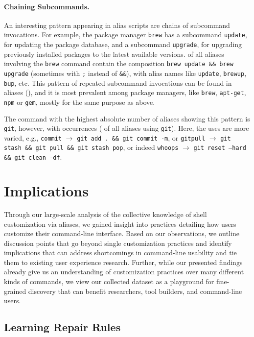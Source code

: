 \documentclass[sigconf,nonacm,screen]{acmart}
\newcommand{\num}[1]{\numprint{#1}}
\newcommand{\per}[1]{\numprint[\%]{#1}}
\newcommand{\alias}[2]{{\texttt{#1} $\rightarrow$ \texttt{#2}}}
\newcommand{\cmd}[1]{{\texttt{#1}}}
\begin{document}
\paragraph{\bf Chaining Subcommands.}

An interesting pattern appearing in alias scripts are chains of subcommand invocations.
For example, the package manager \cmd{brew} has a subcommand \texttt{update}, for updating the package database, and a subcommand \texttt{upgrade}, for upgrading previously installed packages to the latest available versions.
\per{28.08} of all aliases involving the \cmd{brew} command contain the composition \verb|brew update && brew upgrade| (sometimes with \verb|;| instead of \verb|&&|), with alias names like \verb|update|, \verb|brewup|, \verb|bup|, etc.
This pattern of repeated subcommand invocations can be found in \num{22062} aliases (\per{1}), and it is most prevalent among package managers, like \cmd{brew}, \cmd{apt-get}, \cmd{npm} or \cmd{gem}, mostly for the same purpose as above.

The command with the highest absolute number of aliases showing this pattern is \cmd{git}, however, with \num{12063} occurrences (\per{3.89} of all aliases using \cmd{git}).
Here, the uses are more varied, 
e.g., \alias{commit}{git add . \&\& git commit -m}, 
or \alias{gitpull}{git stash \&\& git pull \&\& git stash pop},
or indeed \alias{whoops}{git reset --hard \&\& git clean -df}.

\section{Implications}

Through our large-scale analysis of the collective knowledge of shell customization via aliases,
we gained insight into practices detailing how users customize their command-line interface.
Based on our observations, we outline discussion points that go beyond single customization practices and identify implications that can address shortcomings in command-line usability and tie them to existing user experience research.
Further, while our presented findings already give us an understanding of customization practices over many different kinds of commands, we view our collected dataset as a playground for fine-grained discovery that can benefit researchers, tool builders, and command-line users.

\subsection{Learning Repair Rules}
\label{sec:repair-rules}
\end{document}
